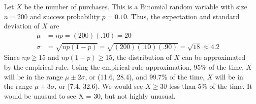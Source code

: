 \documentclass[11pt]{exam}
\begin{document}
\begin{questions}
\begin{solution}
Let $X$ be the number of purchases.  This is a Binomial random variable with
size $n = 200$ and success probability $p = 0.10$.  Thus, the expectation and
standard deviation of $X$ are
\begin{align*}
  \mu &= n p = (200)(.10) = 20 \\
  \sigma &= \sqrt{n p (1 - p)} = \sqrt{(200)(.10)(.90)} = \sqrt{18} \approx 4.2
\end{align*}
Since $n p \geq 15$ and $n p (1 - p) \geq 15$, the distribution of $X$ can be
approximated by the empirical rule.  Using the empirical rule
approximation, 95\% of the time, $X$ will be in
the range $\mu \pm 2 \sigma$, or (11.6, 28.4), and 99.7\% of the time, $X$
will be in the range $\mu \pm 3 \sigma$, or (7.4, 32.6).  We would see $X \geq 30$ less
than 5\% of the time.  It would be unusual to see X = 30, but not highly
unusual.
\end{solution}




\end{questions}
\end{document}
